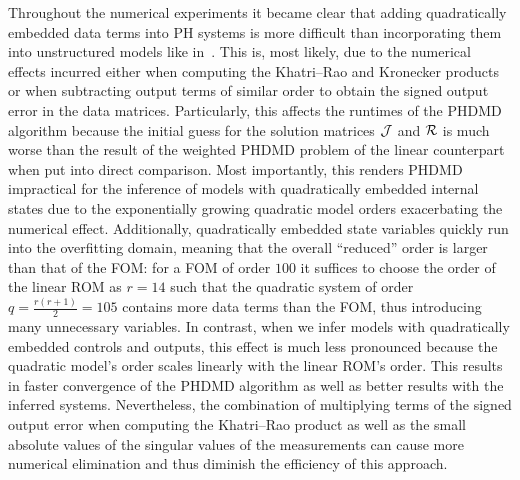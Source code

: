 Throughout the numerical experiments it became clear that adding quadratically embedded data terms into \ac{PH} systems is more difficult than incorporating them into unstructured models like in~\cite{Geelen2023}.
This is, most likely, due to the numerical effects incurred either when computing the Khatri--Rao and Kronecker products or when subtracting output terms of similar order to obtain the signed output error in the data matrices.
Particularly, this affects the runtimes of the \ac{PHDMD} algorithm because the initial guess for the solution matrices $\mathcal{J}$ and $\mathcal{R}$ is much worse than the result of the weighted \ac{PHDMD} problem of the linear counterpart when put into direct comparison.
Most importantly, this renders \ac{PHDMD} impractical for the inference of models with quadratically embedded internal states due to the exponentially growing quadratic model orders exacerbating the numerical effect.
Additionally, quadratically embedded state variables quickly run into the overfitting domain, meaning that the overall ``reduced'' order is larger than that of the \ac{FOM}: for a \ac{FOM} of order $100$ it suffices to choose the order of the linear \ac{ROM} as $r = 14$ such that the quadratic system of order $q = \frac{r (r + 1)}{2} = 105$ contains more data terms than the \ac{FOM}, thus introducing many unnecessary variables.
In contrast, when we infer models with quadratically embedded controls and outputs, this effect is much less pronounced because the quadratic model's order scales linearly with the linear \ac{ROM}'s order.
This results in faster convergence of the \ac{PHDMD} algorithm as well as better results with the inferred systems.
Nevertheless, the combination of multiplying terms of the signed output error when computing the Khatri--Rao product as well as the small absolute values of the singular values of the measurements can cause more numerical elimination and thus diminish the efficiency of this approach.



